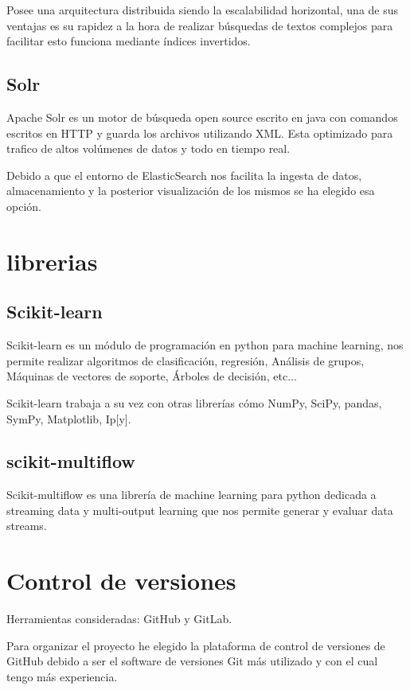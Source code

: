 Posee una arquitectura distribuida siendo la escalabilidad horizontal, una de sus ventajas es su rapidez a la hora de realizar búsquedas de textos complejos para facilitar esto funciona mediante índices invertidos.\cite{pagina:ElasticSearch}  
\subsection{Solr}
Apache Solr es un motor de búsqueda open source escrito en java con comandos escritos en HTTP y guarda los archivos utilizando XML. Esta optimizado para trafico de altos volúmenes de datos y todo en tiempo real.\cite{pagina:Solr} 

Debido a que el entorno de ElasticSearch nos facilita la ingesta de datos, almacenamiento y la posterior visualización de los mismos se ha elegido esa opción.


\section{librerias}

\subsection{Scikit-learn}

Scikit-learn es un módulo de programación en python para machine learning, nos permite realizar algoritmos de clasificación, regresión, Análisis de grupos, Máquinas de vectores de soporte, Árboles de decisión, etc...

Scikit-learn trabaja a su vez con otras librerías cómo NumPy, SciPy, pandas, SymPy, Matplotlib, Ip[y].\cite{pagina:scikit-learn}

\subsection{scikit-multiflow}

Scikit-multiflow es una librería de machine learning para python dedicada a streaming data y multi-output learning que nos permite generar y evaluar data streams.\cite{pagina:scikit-mutliflow}


\section{Control de versiones}

Herramientas consideradas: GitHub y GitLab.

Para organizar el proyecto he elegido la plataforma de control de versiones de GitHub debido a ser el software de versiones Git más utilizado y con el cual tengo más experiencia.


